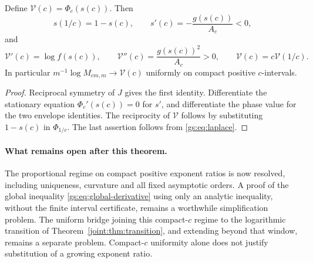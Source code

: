 \begin{corollary}
\label{gs:cor:envelope}
Define $\mathcal V(c)=\Phi_c(s(c))$. Then
\[
 s(1/c)=1-s(c),\qquad
 s'(c)=-\frac{g(s(c))}{A_c}<0,
\]
and
\[
 \mathcal V'(c)=\log f(s(c)),\qquad
 \mathcal V''(c)=\frac{g(s(c))^2}{A_c}>0,
 \qquad \mathcal V(c)=c\mathcal V(1/c).
\]
In particular $m^{-1}\log M_{cm,m}\to\mathcal V(c)$ uniformly on
compact positive $c$-intervals.
\end{corollary}
\begin{proof}
Reciprocal symmetry of $J$ gives the first identity. Differentiate
the stationary equation $\Phi_c'(s(c))=0$ for $s'$, and differentiate
the phase value for the two envelope identities. The reciprocity of
$\mathcal V$ follows by substituting $1-s(c)$ in $\Phi_{1/c}$.
The last assertion follows from \eqref{gs:eq:laplace}.
\end{proof}

\paragraph{What remains open after this theorem.}
The proportional regime on compact positive exponent ratios is now
resolved, including uniqueness, curvature and all fixed asymptotic
orders. A proof of the global inequality \eqref{gs:eq:global-derivative}
using only an analytic inequality, without the finite interval
certificate, remains a worthwhile simplification problem. The uniform
bridge joining this compact-$c$ regime to the logarithmic transition
of Theorem~\ref{joint:thm:transition}, and extending beyond that
window, remains a separate problem. Compact-$c$ uniformity alone
does not justify substitution of a growing exponent ratio.
